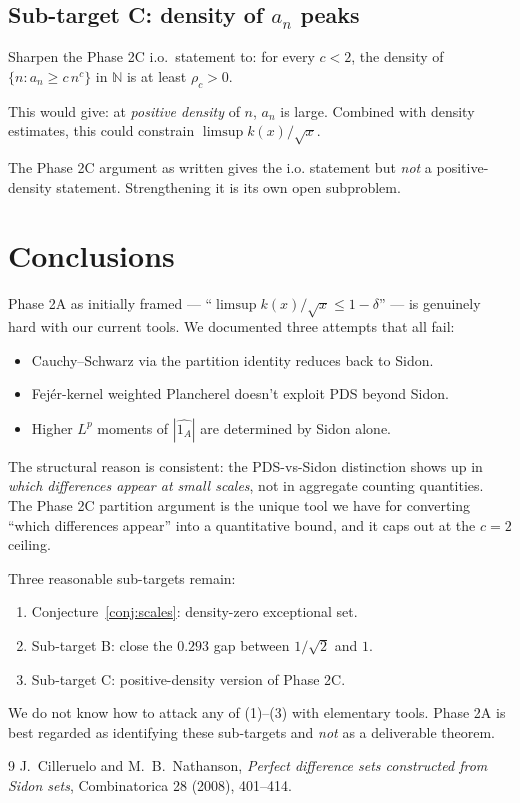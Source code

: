 \documentclass[11pt]{article}
\begin{document}
\subsection{Sub-target C: density of $a_n$ peaks}

Sharpen the Phase 2C i.o.\ statement to: for every $c < 2$, the density
of $\{n : a_n \geq c\, n^c\}$ in $\mathbb{N}$ is at least $\rho_c > 0$.

This would give: at \emph{positive density} of $n$, $a_n$ is large.
Combined with density estimates, this could constrain
$\limsup k(x)/\sqrt x$.

The Phase 2C argument as written gives the i.o. statement but
\emph{not} a positive-density statement. Strengthening it is its
own open subproblem.

\section{Conclusions}

Phase 2A as initially framed --- ``$\limsup k(x)/\sqrt x \leq 1 - \delta$''
--- is genuinely hard with our current tools. We documented three
attempts that all fail:

\begin{itemize}
\item Cauchy--Schwarz via the partition identity reduces back to Sidon.
\item Fej\'er-kernel weighted Plancherel doesn't exploit PDS beyond Sidon.
\item Higher $L^p$ moments of $|\widehat{1_A}|$ are determined by Sidon
      alone.
\end{itemize}

The structural reason is consistent: the PDS-vs-Sidon distinction shows
up in \emph{which differences appear at small scales}, not in
aggregate counting quantities. The Phase 2C partition argument is the
unique tool we have for converting ``which differences appear'' into a
quantitative bound, and it caps out at the $c = 2$ ceiling.

Three reasonable sub-targets remain:

\begin{enumerate}
\item Conjecture~\ref{conj:scales}: density-zero exceptional set.
\item Sub-target B: close the $0.293$ gap between $1/\sqrt 2$ and $1$.
\item Sub-target C: positive-density version of Phase 2C.
\end{enumerate}

We do not know how to attack any of (1)--(3) with elementary tools.
Phase 2A is best regarded as identifying these sub-targets and
\emph{not} as a deliverable theorem.

\begin{thebibliography}{9}
 J.~Cilleruelo and M.~B.~Nathanson, \emph{Perfect
  difference sets constructed from Sidon sets}, Combinatorica 28 (2008),
  401--414.
\end{thebibliography}
\end{document}
